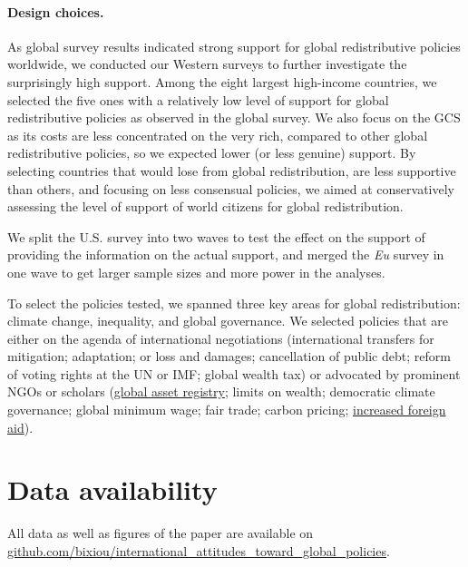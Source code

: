 \documentclass[12pt,english]{article}
\begin{document}
\begin{small}
\paragraph{\small Design choices.}

As global survey results indicated strong support for global redistributive policies worldwide, we conducted our Western surveys to further investigate the surprisingly high support.  %
Among the eight largest high-income countries, we selected the five ones with a relatively low level of support for global redistributive policies as observed in the global survey. We also focus on the GCS as its costs are less concentrated on the very rich, compared to other global redistributive policies, so we expected lower (or less genuine) support. By selecting countries that would lose from global redistribution, are less supportive than others, and focusing on less consensual policies, we aimed at conservatively assessing the level of support of world citizens for global redistribution. 

We split the U.S. survey into two waves to test the effect on the support of providing the information on the actual support, and merged the \textit{Eu} survey in one wave to get larger sample sizes and more power in the analyses. 

To select the policies tested, we spanned three key areas for global redistribution: climate change, inequality, and global governance. We selected policies that are either on the agenda of international negotiations (international transfers for mitigation; adaptation; or loss and damages; cancellation of public debt; reform of voting rights at the UN or IMF; global wealth tax) or advocated by prominent NGOs or scholars (\href{https://static1.squarespace.com/static/5a0c602bf43b5594845abb81/t/5c988368eef1a1538c2ae7eb/1553498989927/GAR.pdf}{global asset registry}; limits on wealth;\citep{robeyns_limitarianism_2024,piketty_brief_2022} democratic climate governance;\citep{dryzek_global_2011} global minimum wage;\citep{palley_financial_2013} fair trade;\citep{hickel_divide_2017} carbon pricing;\citep{cramton_global_2017} \href{https://concordeurope.org/wp-content/uploads/2019/11/CONCORD_AidWatch_Report_2019_web.pdf}{increased foreign aid}).

\section*{\normalsize Data availability}

All data as well as figures of the paper are available on \href{https://github.com/bixiou/international_attitudes_toward_global_policies}{github.com/bixiou/international\_attitudes\_toward\_global\_policies}. 


\end{small}
\end{document}
